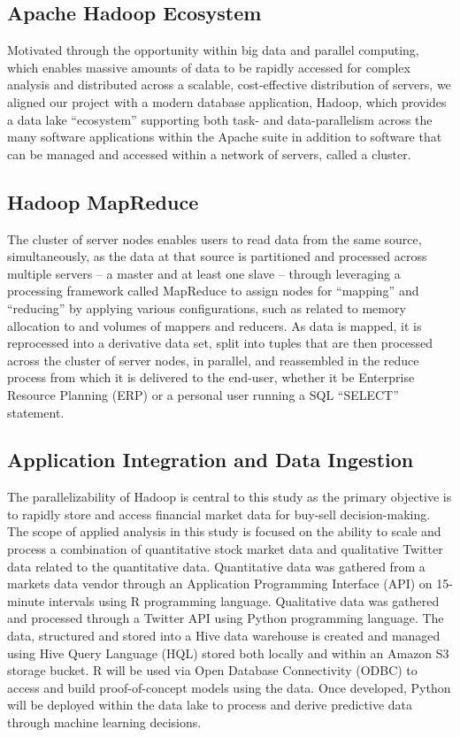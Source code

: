 \documentclass[journal]{IEEEtran}
\begin{document}
\subsection{Apache Hadoop Ecosystem}
Motivated through the opportunity within big data and parallel computing, which enables massive amounts of data to be rapidly accessed for complex analysis and distributed across a scalable, cost-effective distribution of servers, we aligned our project with a modern database application, Hadoop, which provides a data lake ``ecosystem'' supporting both task- and data-parallelism across the many software applications within the Apache suite in addition to software that can be managed and accessed within a network of servers, called a cluster.
\subsection{Hadoop MapReduce}
The cluster of server nodes enables users to read data from the same source, simultaneously, as the data at that source is partitioned and processed across multiple servers – a master and at least one slave – through leveraging a processing framework called MapReduce to assign nodes for ``mapping'' and ``reducing'' by applying various configurations, such as related to memory allocation to and volumes of mappers and reducers. As data is mapped, it is reprocessed into a derivative data set, split into tuples that are then processed across the cluster of server nodes, in parallel, and reassembled in the reduce process from which it is delivered to the end-user, whether it be Enterprise Resource Planning (ERP) or a personal user running a SQL “SELECT” statement.
\subsection{Application Integration and Data Ingestion}
The parallelizability of Hadoop is central to this study as the primary objective is to rapidly store and access financial market data for buy-sell decision-making. The scope of applied analysis in this study is focused on the ability to scale and process a combination of quantitative stock market data and qualitative Twitter data related to the quantitative data. 
Quantitative data was gathered from a markets data vendor through an Application Programming Interface (API) on 15-minute intervals using R programming language. Qualitative data was gathered and processed through a Twitter API using Python programming language. The data, structured and stored into a Hive data warehouse is created and managed using Hive Query Language (HQL) stored both locally and within an Amazon S3 storage bucket. R will be used via Open Database Connectivity (ODBC) to access and build proof-of-concept models using the data. Once developed, Python will be deployed within the data lake to process and derive predictive data through machine learning decisions.
\end{document}
